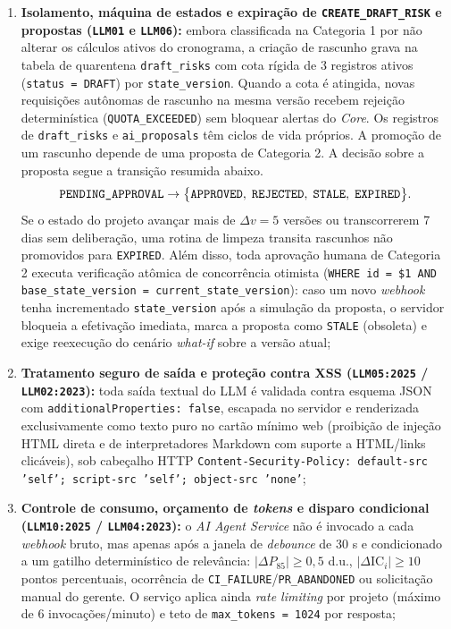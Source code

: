 \documentclass[12pt,openany,oneside,a4paper,english,brazilian,sumario=tradicional]{abntex2}
\newcommand{\IC}{\mathrm{IC}}
\begin{document}
\begin{enumerate}
  \item \textbf{Isolamento, máquina de estados e expiração de \texttt{CREATE\_\allowbreak DRAFT\_\allowbreak RISK} e propostas (\texttt{LLM01} e \texttt{LLM06}):} embora classificada na Categoria 1 por não alterar os cálculos ativos do cronograma, a criação de rascunho grava na tabela de quarentena \texttt{draft\_\allowbreak risks} com cota rígida de 3 registros ativos (\texttt{status = DRAFT}) por \texttt{state\_\allowbreak version}. Quando a cota é atingida, novas requisições autônomas de rascunho na mesma versão recebem rejeição determinística (\texttt{QUOTA\_\allowbreak EXCEEDED}) sem bloquear alertas do \textit{Core}. Os registros de \texttt{draft\_\allowbreak risks} e \texttt{ai\_\allowbreak proposals} têm ciclos de vida próprios. A promoção de um rascunho depende de uma proposta de Categoria 2. A decisão sobre a proposta segue a transição resumida abaixo.
  {\small
  \begin{equation}
  \texttt{PENDING\_\allowbreak APPROVAL} \to \big\{\texttt{APPROVED},\;\texttt{REJECTED},\;\texttt{STALE},\;\texttt{EXPIRED}\big\}.
  \end{equation}}
  Se o estado do projeto avançar mais de $\Delta v = 5$ versões ou transcorrerem 7 dias sem deliberação, uma rotina de limpeza transita rascunhos não promovidos para \texttt{EXPIRED}. Além disso, toda aprovação humana de Categoria 2 executa verificação atômica de concorrência otimista (\texttt{WHERE id = \$1 AND base\_\allowbreak state\_\allowbreak version = current\_\allowbreak state\_\allowbreak version}): caso um novo \textit{webhook} tenha incrementado \texttt{state\_\allowbreak version} após a simulação da proposta, o servidor bloqueia a efetivação imediata, marca a proposta como \texttt{STALE} (obsoleta) e exige reexecução do cenário \textit{what-if} sobre a versão atual;
  \item \textbf{Tratamento seguro de saída e proteção contra XSS (\texttt{LLM05:2025} / \texttt{LLM02:2023}):} toda saída textual do LLM é validada contra esquema JSON com \texttt{additionalProperties: false}, escapada no servidor e renderizada exclusivamente como texto puro no cartão mínimo web (proibição de injeção HTML direta e de interpretadores Markdown com suporte a HTML/links clicáveis), sob cabeçalho HTTP \texttt{Content-Security-Policy: default-src 'self'; script-src 'self'; object-src 'none'};
  \item \textbf{Controle de consumo, orçamento de \textit{tokens} e disparo condicional (\texttt{LLM10:2025} / \texttt{LLM04:2023}):} o \textit{AI Agent Service} não é invocado a cada \textit{webhook} bruto, mas apenas após a janela de \textit{debounce} de 30 s e condicionado a um gatilho determinístico de relevância: $|\Delta P_{85}| \ge 0{,}5$ d.u., $|\Delta\IC_i| \ge 10$ pontos percentuais, ocorrência de \texttt{CI\_\allowbreak FAILURE}/\texttt{PR\_\allowbreak ABANDONED} ou solicitação manual do gerente. O serviço aplica ainda \textit{rate limiting} por projeto (máximo de 6 invocações/minuto) e teto de \texttt{max\_\allowbreak tokens = 1024} por resposta;

\end{enumerate}
\end{document}
